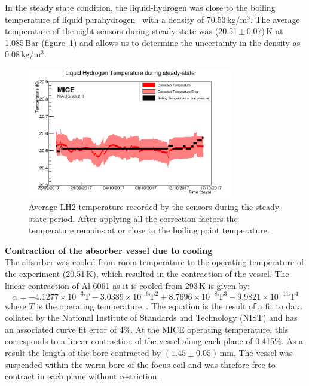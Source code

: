 In the steady state condition, the liquid-hydrogen was close to the
boiling temperature of liquid parahydrogen~\cite{NOTE524} with a
density of 70.53\,kg/m$^{3}$.
The average temperature of the eight sensors during steady-state was
(20.51\,$\mathrm{\pm}$\,0.07)\,K at 1.085\,Bar
(figure~\ref{Fig:TempCalibrated}) and allows us to determine the
uncertainty in the density as 0.08\,kg/m$^{3}$. \\
\begin{figure}
  \begin{center}
    \includegraphics[width=0.80\textwidth]{SteadyState60mK_logo.png}
  \end{center}
  \caption{
    Average LH2 temperature recorded by the sensors during the
    steady-state period.
    After applying all the correction factors the temperature remains
    at or close to the boiling point temperature.
  }
  \label{Fig:TempCalibrated}
\end{figure}
 

\noindent\textbf{Contraction of the absorber vessel due to cooling} \\
\noindent
The absorber was cooled from room temperature to the operating
temperature of the experiment (20.51\,K), which resulted in the
contraction of the vessel.
The linear contraction of Al-6061 as it is cooled from 293\,K is given
by: 
\begin{equation}
  \alpha =-4.1277\times {10}^{-3}\mathrm{T}-3.0389\times {10}^{-6}\mathrm{T}^2+8.7696\times {10}^{-8}\mathrm{T}^3-9.9821\times {10}^{-11}\mathrm{T}^4
\end{equation}
where $T$ is the operating temperature~\cite{Hardin}.
The equation is the result of a fit to data collated by the National
Institute of Standards and Technology (NIST) and has an associated
curve fit error of 4\%. 
At the MICE operating temperature, this corresponds to a linear
contraction of the vessel along each plane of 0.415\%.
As a result the length of the bore contracted by
$(1.45 \pm 0.05)$\,mm.
The vessel was suspended within the warm bore of the focus coil and
was threfore free to contract in each plane without restriction.  \\

